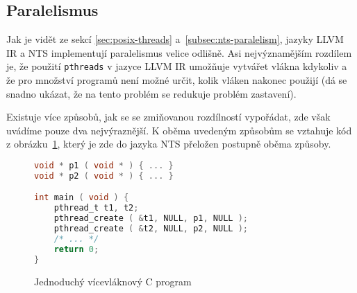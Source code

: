\documentclass[12pt]{fithesis2}
\begin{document}
\subsection{Paralelismus}
\label{subsec:paralelism}
Jak je vidět ze sekcí \ref{sec:posix-threads} a~\ref{subsec:nts-paralelism}, jazyky LLVM IR a NTS implementují paralelismus velice odlišně. Asi nejvýznamějším rozdílem je, že použití \texttt{pthreads} v jazyce LLVM IR umožňuje vytvářet vlákna kdykoliv a že pro množství programů není možné určit, kolik vláken nakonec použijí (dá se snadno ukázat, že na tento problém se redukuje problém zastavení).

Existuje více způsobů, jak se se zmiňovanou rozdílností vypořádat, zde však uvádíme pouze dva nejvýraznější. K oběma uvedeným způsobům se vztahuje kód z obrázku~\ref{fig:llvm2nts:simple-c:orig}, který je zde do jazyka NTS přeložen postupně oběma způsoby.

\begin{figure}[h]
\begin{lstlisting}[language=C]
void * p1 ( void * ) { ... }
void * p2 ( void * ) { ... }

int main ( void ) {
	pthread_t t1, t2;
	pthread_create ( &t1, NULL, p1, NULL );
	pthread_create ( &t2, NULL, p2, NULL );
	/* ... */
	return 0;
}
\end{lstlisting}
\caption{Jednoduchý vícevláknový C program}
\label{fig:llvm2nts:simple-c:orig}
\end{figure}
\end{document}
